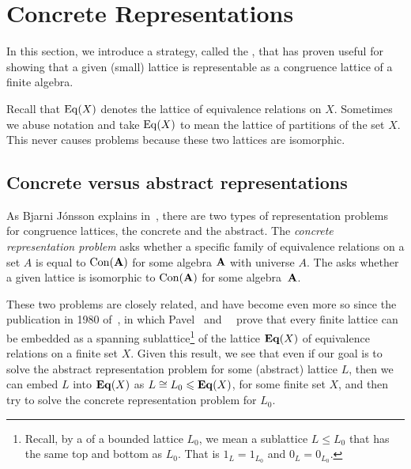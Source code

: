

\section{Concrete Representations}
\label{sec:concr-repr}

In this section, we introduce a strategy, called the , 
that has proven useful for showing
that a given (small) lattice is representable as a congruence lattice of a finite
algebra. 

Recall that  $\operatorname{Eq}(X)$ denotes the lattice of equivalence
relations on $X$. Sometimes we abuse notation and take $\operatorname{Eq}(X)$ to mean the
lattice of partitions of the set $X$. This never causes problems because these
two lattices are isomorphic.  

\subsection{Concrete versus abstract representations}
As Bjarni J\'onsson explains in~\cite{Jonsson:1972}, there are two types of
representation problems for congruence lattices, the concrete and the
abstract.  The \emph{concrete representation problem} asks whether a specific family of
equivalence relations on a set $A$ is equal to $\operatorname{Con}(\mathbf{A})$ for some
algebra $\mathbf{A}$ with universe $A$.  The 
asks whether a given lattice is isomorphic to $\operatorname{Con}(\mathbf{A})$ for some algebra~$\mathbf{A}$.

These two problems are closely related, and have become even more so since the
publication in 1980 
of~\cite{Pudlak:1980}, in which Pavel \Pudlak\ and
\Jiri\ \Tuma\ prove that every finite
lattice can be embedded as a 
spanning sublattice\footnote{Recall, by a 
  of a bounded lattice $L_0$, we mean a sublattice $L\leq L_0$ that has the same top and
  bottom as $L_0$.  That is  $1_L = 1_{L_0}$ and $0_L = 0_{L_0}$.}
of the lattice $\mathbf{Eq}(X)$ of equivalence relations on a finite set $X$.   
Given this result, we see that even if our goal is to solve the abstract
representation problem for some (abstract) lattice $L$, then
we can embed $L$ into $\mathbf{Eq}(X)$ as $L\cong L_0\leqslant \mathbf{Eq}(X)$, for some finite set
$X$, and then try to solve the concrete representation problem for $L_0$.  

